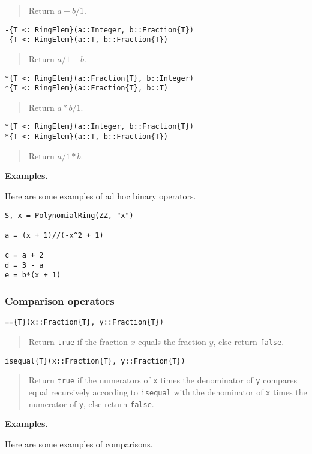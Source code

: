 \documentclass[a4paper,10pt]{article}
\newcommand{\code}{\lstinline}
\newcommand{\desc}[1]{\vspace{-3mm}\begin{quote}#1\end{quote}}
\begin{document}
\desc{Return $a - b/1$.}

\begin{lstlisting}
-{T <: RingElem}(a::Integer, b::Fraction{T})
-{T <: RingElem}(a::T, b::Fraction{T})
\end{lstlisting}

\desc{Return $a/1 - b$.}

\begin{lstlisting}
*{T <: RingElem}(a::Fraction{T}, b::Integer)
*{T <: RingElem}(a::Fraction{T}, b::T)
\end{lstlisting}

\desc{Return $a * b/1$.}

\begin{lstlisting}
*{T <: RingElem}(a::Integer, b::Fraction{T})
*{T <: RingElem}(a::T, b::Fraction{T})
\end{lstlisting}

\desc{Return $a/1 * b$.}

\textbf{Examples.}

Here are some examples of ad hoc binary operators.

\begin{lstlisting}
S, x = PolynomialRing(ZZ, "x")

a = (x + 1)//(-x^2 + 1)

c = a + 2
d = 3 - a
e = b*(x + 1)
\end{lstlisting}

\subsubsection{Comparison operators}

\begin{lstlisting}
=={T}(x::Fraction{T}, y::Fraction{T})
\end{lstlisting}

\desc{Return \code{true} if the fraction $x$ equals the fraction $y$, else
return \code{false}.}

\begin{lstlisting}
isequal{T}(x::Fraction{T}, y::Fraction{T})
\end{lstlisting}

\desc{Return \code{true} if the numerators of \code{x} times the denominator
of \code{y} compares equal recursively according to \code{isequal} with the
denominator of \code{x} times the numerator of \code{y}, else return
\code{false}.}

\textbf{Examples.}

Here are some examples of comparisons.
\end{document}

